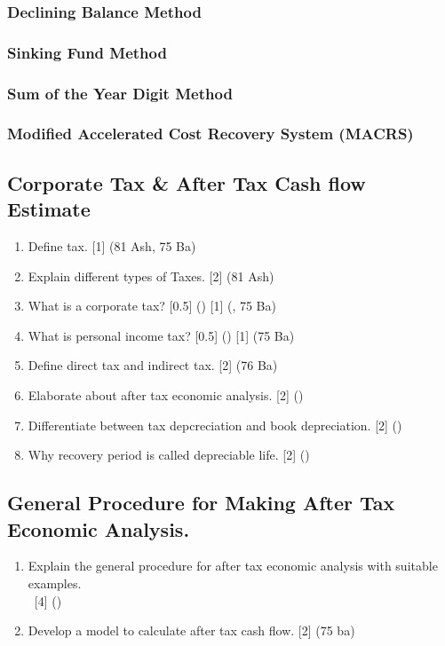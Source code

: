 \documentclass[12pt]{article}
\newcommand{\enter}{\\\textcolor{white}{1}}
\begin{document}
	\subsubsection{Declining Balance Method}
	\subsubsection{Sinking Fund Method}
	\subsubsection{Sum of the Year Digit Method}
	\subsubsection{Modified Accelerated Cost Recovery System (MACRS)}
	\subsection{Corporate Tax \& After Tax Cash flow Estimate}
		\begin{enumerate}[noitemsep, topsep=0pt]
			\item Define tax. \hfill [1] (81 Ash, 75 Ba)

			\item Explain different types of Taxes. \hfill [2] (81 Ash)

			\item What is a corporate tax? \hfill [0.5] () [1] (, 75 Ba)

			\item What is personal income tax? \hfill [0.5] () [1] (75 Ba)

			\item Define direct tax and indirect tax. \hfill [2] (76 Ba)

			\item Elaborate about after tax economic analysis. \hfill [2] ()

			\item Differentiate between tax depcreciation and book depreciation. \hfill [2] ()

			\item Why recovery period is called depreciable life. \hfill [2] ()
		\end{enumerate}

	\subsection{General Procedure for Making After Tax Economic Analysis.}
		\begin{enumerate}[noitemsep, topsep=0pt]
			\item Explain the general procedure for after tax economic analysis with suitable examples.
			\enter\hfill [4] ()

			\item Develop a model to calculate after tax cash flow. \hfill [2] (75 ba)
		\end{enumerate}			
	
\end{document}
